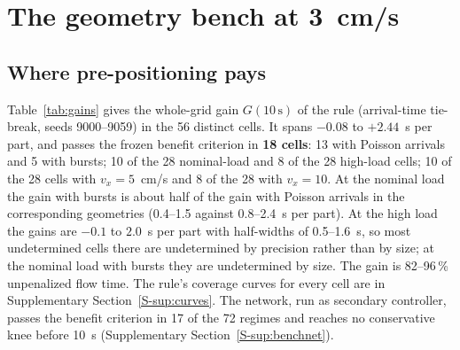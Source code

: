 \documentclass[11pt,a4paper]{article}
\newcommand{\nj}{\textsc{nj}}
\newcommand{\tcross}{\tau_{\mathrm{cross}}}
\newcommand{\supsec}[1]{Supplementary Section~\ref{S-#1}}
\begin{document}
\section{The geometry bench at 3~cm/s}\label{sec:benchresults}

\subsection{Where pre-positioning pays}\label{sec:worth}
Table~\ref{tab:gains} gives the whole-grid gain $G(10\,\mathrm{s})$ of the rule
(arrival-time tie-break, seeds 9000--9059) in the 56 distinct cells. It spans $-0.08$ to
$+2.44$~s per part, and passes the frozen benefit criterion in \textbf{18 cells}: 13 with
Poisson arrivals and 5 with bursts; 10 of the 28 nominal-load and 8 of the 28 high-load
cells; 10 of the 28 cells with $v_x=5$~cm/s and 8 of the 28 with $v_x=10$. At the nominal
load the gain with bursts is about half of the gain with Poisson arrivals in the
corresponding geometries (0.4--1.5 against 0.8--2.4~s per part). At the high load the
gains are $-0.1$ to $2.0$~s per part with half-widths of 0.5--1.6~s, so most undetermined
cells there are undetermined by precision rather than by size; at the nominal load with
bursts they are undetermined by size. The gain is 82--96\,\% unpenalized flow time. The
rule's coverage curves for every cell are in \supsec{sup:curves}. The network, run as
secondary controller, passes the benefit criterion in 17 of the 72 regimes and reaches no
conservative knee before 10~s (\supsec{sup:benchnet}).

\begin{table}[t]
\centering\small
\caption{Geometry bench, \nj\ (arrival-time tie-break, seeds 9000--9059): gain of
pre-positioning with the whole grid,
$G(10\,\mathrm{s})=J_{\mathrm{none}}-J_{\mathrm{when\_idle}}$ at 10~s of anticipation
[s per part], paired over 60 realizations, 95\,\% CI. Columns: the seven distinct
crossing times with the geometry that realizes them (cells with the same $\tcross$ are
identical, \supsec{sup:checks}). Bold: worth sizing the coverage for ($G\ge1$~s per part,
lower bound $\ge0.5$).}
\label{tab:gains}
\resizebox{\linewidth}{!}{}
\end{table}
\end{document}
